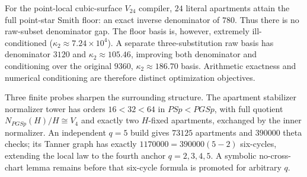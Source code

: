 For the point-local cubic-surface $V_{24}$ compiler, $24$ literal apartments attain the full point-star Smith floor: an exact inverse denominator of $780$.  Thus there is no raw-subset denominator gap.  The floor basis is, however, extremely ill-conditioned ($\kappa_2\approx7.24\times10^4$).  A separate three-substitution raw basis has denominator $3120$ and $\kappa_2\approx105.46$, improving both denominator and conditioning over the original $9360$, $\kappa_2\approx186.70$ basis.  Arithmetic exactness and numerical conditioning are therefore distinct optimization objectives.

Three finite probes sharpen the surrounding structure.  The apartment stabilizer normalizer tower has orders $16<32<64$ in $PSp<PGSp$, with full quotient $N_{PGSp}(H)/H\cong V_4$ and exactly two $H$-fixed apartments, exchanged by the inner normalizer.  An independent $q=5$ build gives $73125$ apartments and $390000$ theta checks; its Tanner graph has exactly $1170000=390000(5-2)$ six-cycles, extending the local law to the fourth anchor $q=2,3,4,5$.  A symbolic no-cross-chart lemma remains before that six-cycle formula is promoted for arbitrary $q$.
\fi
%
%
